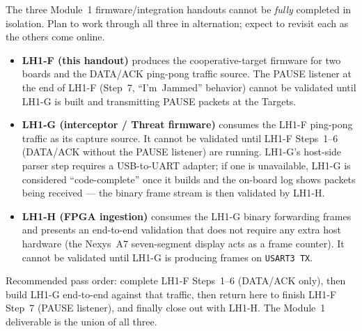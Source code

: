 \documentclass[11pt,letterpaper]{article}
\begin{document}
\newpage
\begin{tcolorbox}[warning={LH1-F, LH1-G, and LH1-H are tightly interconnected --- read this first}]
The three Module~1 firmware/integration handouts cannot be \emph{fully} completed in isolation. Plan to work through all three in alternation; expect to revisit each as the others come online.
\begin{itemize}[leftmargin=1.2em]
	\item \textbf{LH1-F (this handout)} produces the cooperative-target firmware for two boards and the DATA/ACK ping-pong traffic source. The PAUSE listener at the end of LH1-F (Step~7, ``I'm~Jammed'' behavior) cannot be validated until LH1-G is built and transmitting PAUSE packets at the Targets.
	\item \textbf{LH1-G (interceptor / Threat firmware)} consumes the LH1-F ping-pong traffic as its capture source. It cannot be validated until LH1-F Steps~1--6 (DATA/ACK without the PAUSE listener) are running. LH1-G's host-side parser step requires a USB-to-UART adapter; if one is unavailable, LH1-G is considered ``code-complete'' once it builds and the on-board log shows packets being received --- the binary frame stream is then validated by LH1-H.
	\item \textbf{LH1-H (FPGA ingestion)} consumes the LH1-G binary forwarding frames and presents an end-to-end validation that does not require any extra host hardware (the Nexys~A7 seven-segment display acts as a frame counter). It cannot be validated until LH1-G is producing frames on \texttt{USART3 TX}.
\end{itemize}
Recommended pass order: complete LH1-F Steps~1--6 (DATA/ACK only), then build LH1-G end-to-end against that traffic, then return here to finish LH1-F Step~7 (PAUSE listener), and finally close out with LH1-H. The Module~1 deliverable is the union of all three.
\end{tcolorbox}

\newpage
\end{document}
